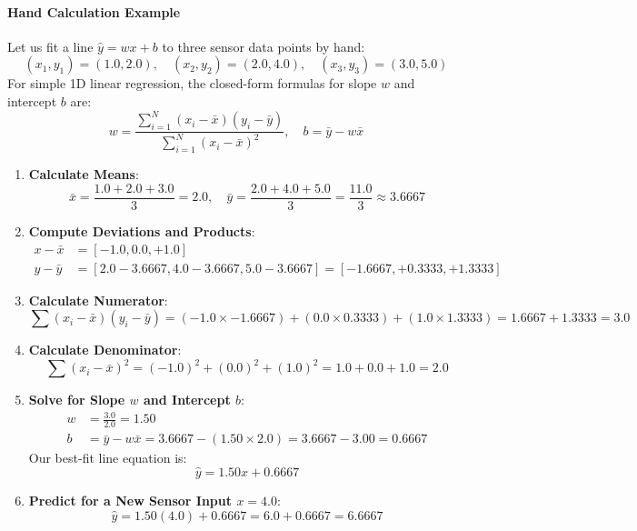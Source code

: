 \paragraph{Hand Calculation Example}
Let us fit a line $\hat{y} = w x + b$ to three sensor data points by hand:
\begin{equation*}
(x_1, y_1) = (1.0, 2.0), \quad (x_2, y_2) = (2.0, 4.0), \quad (x_3, y_3) = (3.0, 5.0)
\end{equation*}
For simple 1D linear regression, the closed-form formulas for slope $w$ and intercept $b$ are:
\begin{equation}
w = \frac{\sum_{i=1}^N (x_i - \bar{x})(y_i - \bar{y})}{\sum_{i=1}^N (x_i - \bar{x})^2}, \quad b = \bar{y} - w \bar{x}\label{eq:1d_slope_intercept}
\end{equation}
\begin{enumerate}
    \item \textbf{Calculate Means}:
    \begin{equation*}
    \bar{x} = \frac{1.0 + 2.0 + 3.0}{3} = 2.0, \quad \bar{y} = \frac{2.0 + 4.0 + 5.0}{3} = \frac{11.0}{3} \approx 3.6667
    \end{equation*}
    \item \textbf{Compute Deviations and Products}:
    \begin{align*}
    x - \bar{x} &= [-1.0, 0.0, +1.0] \\
    y - \bar{y} &= [2.0 - 3.6667, 4.0 - 3.6667, 5.0 - 3.6667] = [-1.6667, +0.3333, +1.3333]
    \end{align*}
    \item \textbf{Calculate Numerator}:
    \begin{equation*}
    \sum (x_i - \bar{x})(y_i - \bar{y}) = (-1.0 \times -1.6667) + (0.0 \times 0.3333) + (1.0 \times 1.3333) = 1.6667 + 1.3333 = 3.0
    \end{equation*}
    \item \textbf{Calculate Denominator}:
    \begin{equation*}
    \sum (x_i - \bar{x})^2 = (-1.0)^2 + (0.0)^2 + (1.0)^2 = 1.0 + 0.0 + 1.0 = 2.0
    \end{equation*}
    \item \textbf{Solve for Slope $w$ and Intercept $b$}:
    \begin{align*}
    w &= \frac{3.0}{2.0} = 1.50 \\
    b &= \bar{y} - w\bar{x} = 3.6667 - (1.50 \times 2.0) = 3.6667 - 3.00 = 0.6667
    \end{align*}
    Our best-fit line equation is:
    \begin{equation*}
    \hat{y} = 1.50 x + 0.6667
    \end{equation*}
    \item \textbf{Predict for a New Sensor Input $x = 4.0$}:
    \begin{equation*}
    \hat{y} = 1.50(4.0) + 0.6667 = 6.0 + 0.6667 = 6.6667
    \end{equation*}
\end{enumerate}

